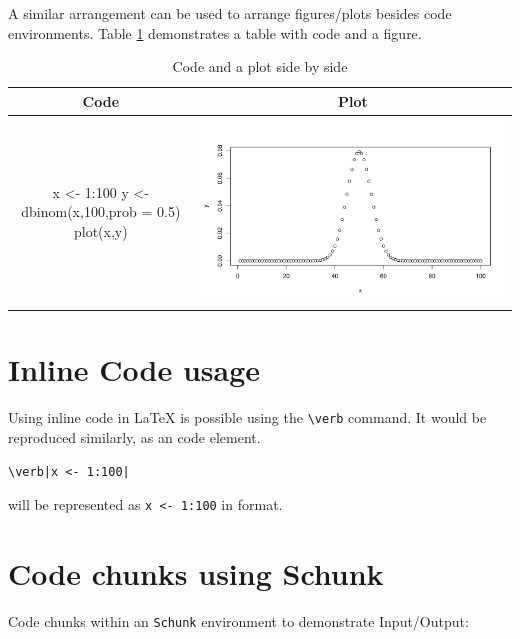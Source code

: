 A similar arrangement can be used to arrange figures/plots besides code environments.
Table \ref{table:3} demonstrates a table with code and a figure.
\begin{table}[htbp]
  \centering
  \begin{tabular}{| c | c |}
  \hline
  Code & Plot\\
    \hline
    \begin{minipage}{0.45\textwidth}
\vspace{1mm}
\begin{example}
x <- 1:100
y <- dbinom(x,100,prob = 0.5)
plot(x,y)
\end{example}
    \end{minipage} &
    \begin{minipage}{0.45\textwidth}
    \centering
    \includegraphics[width=1\textwidth]{binom}
    \end{minipage}\\
    \hline
  \end{tabular}
  \caption{Code and a plot side by side}
  \label{table:3}
\end{table}


\section{Inline Code usage}

Using inline code in LaTeX is possible using the \verb|\verb| command.
It would be reproduced similarly, as an  code element.
\begin{verbatim}
\verb|x <- 1:100|
\end{verbatim}
will be represented as \verb|x <- 1:100| in  format.

\section{Code chunks using Schunk}
Code chunks within an \verb|Schunk| environment to demonstrate Input/Output:

